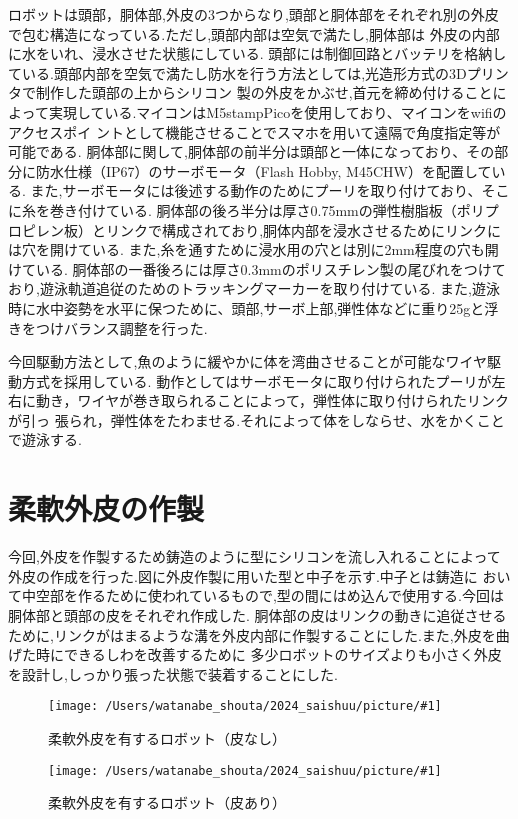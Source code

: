 \documentclass{jarticle}
\newcommand{\setPicture}[1]{\texttt{[image: /Users/watanabe\_shouta/2024\_saishuu/picture/\#1]}}
\begin{document}
ロボットは頭部，胴体部,外皮の3つからなり,頭部と胴体部をそれぞれ別の外皮で包む構造になっている.ただし,頭部内部は空気で満たし,胴体部は
外皮の内部に水をいれ、浸水させた状態にしている.
頭部には制御回路とバッテリを格納している.頭部内部を空気で満たし防水を行う方法としては,光造形方式の3Dプリンタで制作した頭部の上からシリコン
製の外皮をかぶせ,首元を締め付けることによって実現している.マイコンはM5stampPicoを使用しており、マイコンをwifiのアクセスポイ
ントとして機能させることでスマホを用いて遠隔で角度指定等が可能である.
胴体部に関して,胴体部の前半分は頭部と一体になっており、その部分に防水仕様（IP67）のサーボモータ（Flash Hobby, M45CHW）を配置している.
また,サーボモータには後述する動作のためにプーリを取り付けており、そこに糸を巻き付けている.
胴体部の後ろ半分は厚さ0.75mmの弾性樹脂板（ポリプロピレン板）とリンクで構成されており,胴体内部を浸水させるためにリンクには穴を開けている.
また,糸を通すために浸水用の穴とは別に2mm程度の穴も開けている.
胴体部の一番後ろには厚さ0.3mmのポリスチレン製の尾びれをつけており,遊泳軌道追従のためのトラッキングマーカーを取り付けている.
また,遊泳時に水中姿勢を水平に保つために、頭部,サーボ上部,弾性体などに重り25gと浮きをつけバランス調整を行った.

今回駆動方法として,魚のように緩やかに体を湾曲させることが可能なワイヤ駆動方式を採用している.
動作としてはサーボモータに取り付けられたプーリが左右に動き，ワイヤが巻き取られることによって，弾性体に取り付けられたリンクが引っ
張られ，弾性体をたわませる.それによって体をしならせ、水をかくことで遊泳する.

\section{柔軟外皮の作製}
今回,外皮を作製するため鋳造のように型にシリコンを流し入れることによって外皮の作成を行った.図に外皮作製に用いた型と中子を示す.中子とは鋳造に
おいて中空部を作るために使われているもので,型の間にはめ込んで使用する.今回は胴体部と頭部の皮をそれぞれ作成した.
胴体部の皮はリンクの動きに追従させるために,リンクがはまるような溝を外皮内部に作製することにした.また,外皮を曲げた時にできるしわを改善するために
多少ロボットのサイズよりも小さく外皮を設計し,しっかり張った状態で装着することにした.

\begin{figure}[t]
   \centering
   \setPicture{skinless.jpg}
   \vspace*{-4mm}
   \caption{柔軟外皮を有するロボット（皮なし）}
   \label{fig:bandable-Torso}
\end{figure}
\begin{figure}[t]
   \centering
   \setPicture{withskin.jpg}
   \vspace*{-4mm}
   \caption{柔軟外皮を有するロボット（皮あり）}
   \label{fig:structure}
\end{figure}
\end{document}
